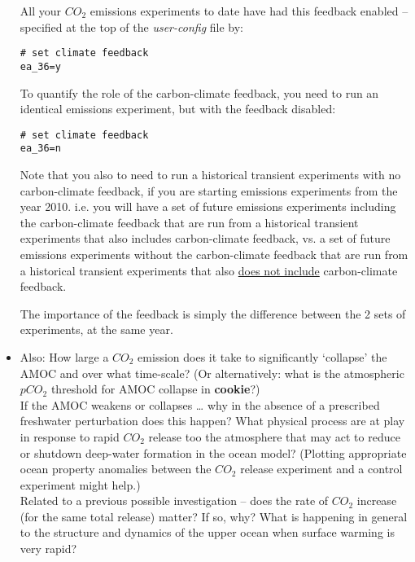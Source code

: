\begin{itemize}[noitemsep]
\vspace{1mm}

All your \(CO_{2}\) emissions experiments to date have had this feedback enabled -- specified at the top of the \textit{user-config} file by:
\vspace{-2pt}\small\begin{verbatim}
# set climate feedback
ea_36=y
\end{verbatim}\normalsize\vspace{-2pt}

To quantify the role of the carbon-climate feedback, you need to run an identical emissions experiment, but with the feedback disabled:
\vspace{-2pt}\small\begin{verbatim}
# set climate feedback
ea_36=n
\end{verbatim}\normalsize\vspace{-2pt}

Note that you also to need to run a historical transient experiments with no carbon-climate feedback, if you are starting emissions experiments from the year 2010. i.e. you will have a set of future emissions experiments including the carbon-climate feedback that are run from a historical transient experiments that also includes carbon-climate feedback, vs. a set of future emissions experiments without the carbon-climate feedback that are run from a historical transient experiments that also \uline{does not include} carbon-climate feedback.

\vspace{1mm}

The importance of the feedback is simply the difference between the 2 sets of experiments, at the same year.

\vspace{1mm}
\item Also: How large a \(CO_{2}\) emission does it take to significantly ‘collapse’ the AMOC and over what time-scale? (Or alternatively: what is the atmospheric \(pCO_{2}\) threshold for AMOC collapse in \textbf{cookie}?)
\\ If the AMOC weakens or collapses … why in the absence of a prescribed freshwater perturbation does this happen? What physical process are at play in response to rapid \(CO_{2}\) release too the atmosphere that may act to reduce or shutdown deep-water formation in the ocean model? (Plotting appropriate ocean property anomalies between the \(CO_{2}\) release experiment and a control experiment might help.)
\\Related to a previous possible investigation -- does the rate of \(CO_{2}\) increase (for the same total release) matter? If so, why? What is happening in general to the structure and dynamics of the upper ocean when surface warming is very rapid?

\end{itemize}

